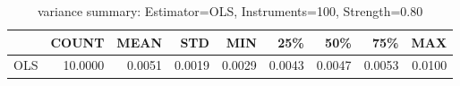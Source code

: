 \begin{table}[ht]
\centering
\caption{variance summary: Estimator=OLS, Instruments=100, Strength=0.80}
\begin{tabular}{lrrrrrrrr}
\toprule
 & COUNT & MEAN & STD & MIN & 25\% & 50\% & 75\% & MAX \\
\midrule
OLS & 10.0000 & 0.0051 & 0.0019 & 0.0029 & 0.0043 & 0.0047 & 0.0053 & 0.0100 \\
\bottomrule
\end{tabular}
\end{table}
